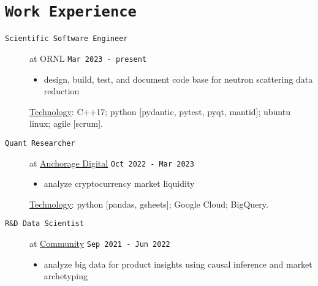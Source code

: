 \documentclass[11pt, letter]{article}
\begin{document}
\section*{\tt Work Experience}
\begin{minipage}{\textwidth}
	\begin{description}
	\item[\tt Scientific Software Engineer] at ORNL 
	\hfill {\tt Mar 2023 - present}
		\vspace{-0.5\baselineskip}
		\begin{itemize}
			\item design, build, test, and document code base for neutron scattering data reduction
		\end{itemize}
		\vspace{-0.5\baselineskip}
		\underline{Technology}: 
		C++17; python [pydantic, pytest, pyqt, mantid]; ubuntu linux; agile [scrum].
	\item[\tt Quant Researcher] at \href{https://www.anchorage.com}{Anchorage Digital} 
	\hfill {\tt Oct 2022 - Mar 2023}
		\vspace{-0.5\baselineskip}
		\begin{itemize}
			\item analyze cryptocurrency market liquidity
		\end{itemize}
		\vspace{-0.5\baselineskip}
		\underline{Technology}: 
		python [pandas, gsheets]; Google Cloud; BigQuery.
	\item[\tt R\&D Data Scientist] at \href{https://www.community.com/about-us}{Community} 
	\hfill {\tt Sep 2021 - Jun 2022}
		\vspace{-0.5\baselineskip}
		\begin{itemize}
			\item analyze big data for product insights using causal inference and market archetyping%
		\end{itemize}

\end{description}
\end{minipage}
\end{document}
